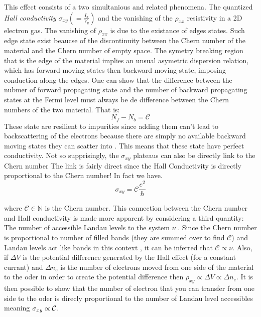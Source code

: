 This effect consists of a two simultanious and related phenomena. The quantized \textit{Hall conductivity} $\sigma_{xy}(=\frac{I_x}{V_y})$ and the vanishing of the $\rho_{xx}$ resistivity in a 2D electron gas. The vanishing of $\rho_{xx}$ is due to the existance of edges states.%
Such edge state exist beaucse of the discontinuity between the Chern number of the material and the Chern number of empty space. The symetry breaking region that is the edge of the material implies an unsual asymetric dispersion relation, which has forward moving states then backward moving state, imposing conduction along the edges. One can show that the difference between the nubmer of forward  propagating state and the number of backward propagating states at the Fermi level must always be de difference between the Chern numbers of the two material\cite{kane_topological_2013}. That is: $$N_f -N_b = \mathcal{C}$$ These state are resilient to impurities since adding them can't lead to backscattering of the electrons because there are simply no available backward moving states they can scatter into \cite{qi_quantum_2010}. This means that these state have perfect conductivity. Not so supprisingly, the $\sigma_{xy}$ plateaus can also be directly link to the Chern number  The link is fairly direct since the Hall Conductivity is directly proportional to the Chern number! In fact we have.
\begin{equation}
\sigma_{xy} = \mathcal{C}\frac{e^2}{\hbar}
\end{equation}

where $\mathcal{C} \in \mathbb{N}$ is the Chern number. This connection between the Chern number and Hall conductivity is made more apparent by considering a third quantity: The number of accessible Landau levels to the system $\nu$ . Since the Chern number is proportional to number of filled bands (they are summed over to find $\mathcal{C}$) and Landau levels act like bands in this context \cite{kane_topological_2013}, it can be inferred that $\mathcal{C}\propto \nu$. Also, if $\Delta V$ is the potential difference generated by the Hall effect (for a constant currant) and $\Delta n_e$ is the number of electrons moved from one side of the material to the oder in order to create the potential difference then $\rho_{xy} \propto \Delta V \propto \Delta n_e$. It is then possible to show that the number of electron that you can transfer from one side to the oder is direcly proportional to the number of Landau level accessibles meaning $\sigma_{xy} \propto \cal{C}$. 

